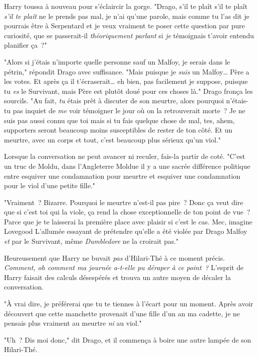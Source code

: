 Harry toussa à nouveau pour s'éclaircir la gorge. "Drago, s'il te plaît s'il te plaît \emph{s'il te plaît} ne le prends pas mal, je n'ai qu'une parole, mais comme tu l'as dit je pourrais être à Serpentard et je veux vraiment te poser cette question par pure curiosité, que se passerait-il \emph{théoriquement parlant} si \emph{je} témoignais t'avoir entendu planifier ça~?"

"Alors si j'étais n'importe quelle personne sauf un Malfoy, je serais dans le pétrin," répondit Drago avec suffisance. "Mais puisque je \emph{suis} un Malfoy… Père a les votes. Et après ça il t'écraserait… eh bien, pas facilement je suppose, puisque tu \emph{es} le Survivant, mais Père est plutôt doué pour ces choses là." Drago fronça les sourcils. "Au fait, \emph{tu} étais prêt à discuter de son meurtre, alors pourquoi n'étais-tu pas inquiet de \emph{me} voir témoigner le jour où on la retrouverait morte~? Je ne suis pas aussi connu que toi mais si tu fais quelque chose de mal, tes, ahem, supporters seront beaucoup moins susceptibles de rester de ton côté. Et un meurtre, avec un corps et tout, c'est beaucoup plus sérieux qu'un viol."

Lorsque la conversation ne peut avancer ni reculer, fais-la partir de coté. "C'est un truc de Moldu, dans l'Angleterre Moldue il y a une sacrée différence politique entre esquiver une condamnation pour meurtre et esquiver une condamnation pour le viol d'une petite fille."

"Vraiment~? Bizarre. Pourquoi le meurtre n'est-il pas pire~? Donc ça veut dire que si c'est toi qui la viole, ça rend la chose exceptionnelle de ton point de vue~? Parce que je te laisserai la première place avec plaisir si c'est le cas. Mec, imagine Lovegood L'allumée essayant de prétendre qu'elle a été violée par Drago Malfoy \emph{et} par le Survivant, même \emph{Dumbledore} ne la croirait pas."

Heureusement que Harry ne buvait \emph{pas} d'Hilari-Thé à ce moment précis. \emph{Comment, oh comment ma journée a-t-elle pu déraper à ce point~?} L'esprit de Harry faisait des calculs désespérés et trouva un autre moyen de décaler la conversation.

"À vrai dire, je préférerai que tu te tiennes à l'écart pour un moment. Après avoir découvert que cette manchette provenait d'une fille d'un an ma cadette, je ne pensais plus vraiment au meurtre \emph{ni} au viol."

"Uh~? Dis moi donc," dit Drago, et il commença à boire une autre lampée de son Hilari-Thé.

